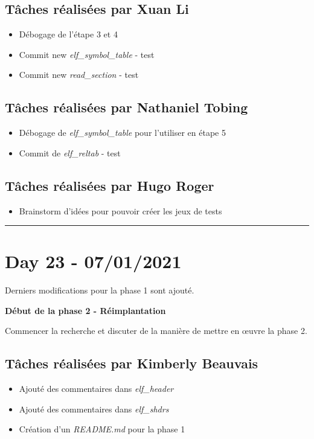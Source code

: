 \documentclass[11pt,letterpaper]{article}
\begin{document}
\subsection*{Tâches réalisées par Xuan Li}
\begin{itemize}
    \item Débogage de l'étape 3 et 4
    \item Commit new \textit{elf\_symbol\_table} - test
    \item Commit new \textit{read\_section} - test
\end{itemize}

\subsection*{Tâches réalisées par Nathaniel Tobing}
\begin{itemize}
    \item Débogage de \textit{elf\_symbol\_table} pour l'utiliser en étape 5
    \item Commit de \textit{elf\_reltab} - test
\end{itemize}

\subsection*{Tâches réalisées par Hugo Roger}
\begin{itemize}
    \item Brainstorm d’idées pour pouvoir créer les jeux de tests

\end{itemize}

\noindent\rule{13cm}{0.4pt}

\section*{Day 23 - 07/01/2021}
Derniers modifications pour la phase 1 sont ajouté. 

\noindent \textbf{Début de la phase 2 - Réimplantation}

\noindent Commencer la recherche et discuter de la manière de mettre en œuvre 
la phase 2.


\subsection*{Tâches réalisées par Kimberly Beauvais}
\begin{itemize}
    \item Ajouté des commentaires dans \textit{elf\_header}
    \item Ajouté des commentaires dans \textit{elf\_shdrs}
    \item Création d'un \textit{README.md} pour la phase 1
\end{itemize}
\end{document}
